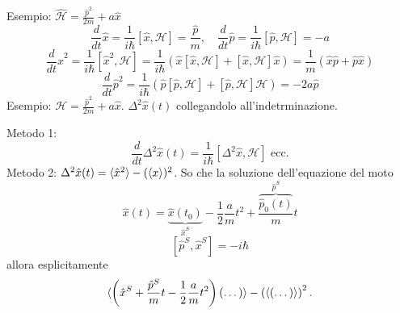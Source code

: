\bigskip
\noindent
Esempio: \( \hat{\mathcal{H}} = \frac{\hat{p}^2}{2m} + a\hat{x} \)
\[
\frac{d}{dt} \hat{x} = \frac{1}{i\hbar} [\hat{x}, \mathcal{H}] = \frac{\hat{p}}{m}, \quad \frac{d}{dt} \hat{p} = \frac{1}{i\hbar} [\hat{p}, \mathcal{H}] = -a
\]
\[
\frac{d}{dt} \hat{x}^2 = \frac{1}{i\hbar} [\hat{x}^2, \mathcal{H}] = \frac{1}{i\hbar} \left( \hat{x} [\hat{x}, \mathcal{H}] + [\hat{x}, \mathcal{H}] \hat{x} \right) = \frac{1}{m} (\hat{x}\hat{p} + \hat{p}\hat{x})
\]
\[
\frac{d}{dt} \hat{p}^2 = \frac{1}{i\hbar} \left( \hat{p}[\hat{p}, \mathcal{H}] + [\hat{p}, \mathcal{H}] \mathcal{H} \right) = -2a\hat{p}
\]
Esempio: \(\mathcal{H} = \frac{\hat{p}^2}{2m} + a\hat{x}\). \( \Delta^2 \hat{x}(t) \) collegandolo all'indetrminazione.

\bigskip
\noindent
Metodo 1:
\[
\frac{d}{dt} \Delta^2 \hat{x}(t) = \frac{1}{i\hbar} [\Delta^2 \hat{x}, \mathcal{H}] \text{ ecc.}
\]
Metodo 2: \( \Delta^2 \hat{x}(t) = \braket{\hat{x}^2} - (\braket{x})^2 \). So che la soluzione dell'equazione del moto 
\[
\hat{x}(t) = \underbrace{\hat{x}(t_0)}_{\hat{x}^S} - \frac{1}{2}\frac{a}{m}t^2 + \frac{\overbrace{\hat{p}_0(t)}^{\hat{p}^S}}{m}t
\]
\[
[\hat{p}^S, \hat{x}^S] = -i\hbar
\]
allora esplicitamente
\[
\braket{\left( \hat{x}^S +\frac{\hat{p}^S}{m}t - \frac{1}{2} \frac{a}{m} t^2 \right) (\dots)} - \left( \braket{(\dots)} \right)^2.
\]
